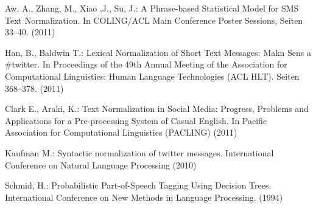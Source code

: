 \documentclass[citeauthoryear]{llncs}
\begin{document}

\begin{thebibliography}{}

 Aw, A., Zhang, M., Xiao ,J., Su, J.:
  A Phrase-based Statistical Model for {SMS} Text Normalization.
  In COLING/ACL Main Conference Poster Sessions,
  Seiten 33--40.
  (2011)

 Han, B., Baldwin T.:
  Lexical Normalization of Short Text Messages: Makn Sens a
  \#{}twitter.
  In Proceedings of the 49th Annual Meeting of the Association
  for Computational Linguistics: Human Language Technologies (ACL
  HLT). Seiten 368--378.
  (2011)

 Clark E., Araki, K.:
  Text Normalization in Social Media: Progress, Problems
  and Applications for a Pre-processing System of Casual
  English.
  In Pacific Association for Computational Linguistics
  (PACLING)
  (2011)

 Kaufman M.:
  Syntactic normalization of twitter messages.
  International Conference on Natural Language Processing
  (2010)

 Schmid, H.:
  Probabilistic Part-of-Speech Tagging Using Decision Trees.
  International Conference on New Methods in Language Processing.
  (1994)
\end{thebibliography}
\end{document}
